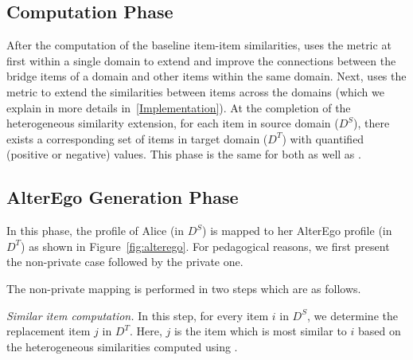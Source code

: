 \subsection{{\large \bf \graphsim} Computation Phase}
After the computation of the baseline item-item similarities, \crossrec uses the \graphsim metric at first within a single domain to extend and improve the connections between the bridge items of a domain and other items within the same domain. Next, \crossrec uses the \graphsim metric to extend the similarities between items across the domains (which we explain in more details in~\autoref{Implementation}). At the completion of the heterogeneous similarity extension, for each item in source domain ($D^S$), there exists a corresponding set of items in target domain ($D^T$) with quantified (positive or negative) \graphsim values. This phase is the same for both \crossrec as well as \npcrossrec.

\subsection{AlterEgo Generation Phase}
In this phase, the profile of Alice (in $D^S$) is mapped to her AlterEgo profile (in $D^T$) as shown in Figure~\ref{fig:alterego}. For pedagogical reasons, we first present the non-private case followed by the private one.

 The non-private mapping is performed in two steps which are as follows.

{\it Similar item computation.} In this step, for every item $i$ in $D^S$, we determine the replacement item $j$ in $D^T$. Here, $j$ is the item which is most similar to $i$ based on the heterogeneous similarities computed using \graphsim.


